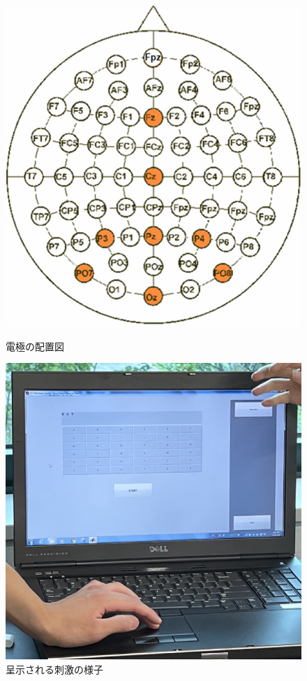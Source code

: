 \begin{figure}[H]
    \centering
    \begin{minipage}[b]{.32\textwidth}
        \centering
        \includegraphics[keepaspectratio,width=.7\textwidth]{../../12_DataAnalysis/denkyoku.png}
        \caption{電極の配置図\footnotemark[1]}
        \label{fig:電極の配置図}
    \end{minipage}
    \begin{minipage}[b]{.32\textwidth}
        \centering
        \includegraphics[keepaspectratio,width=.7\textwidth]{../../12_DataAnalysis/bmi_exp1.jpeg}
        \caption{呈示される刺激の様子}
    \end{minipage}
    \begin{minipage}[b]{.32\textwidth}
        \centering

\end{minipage}
\end{figure}
